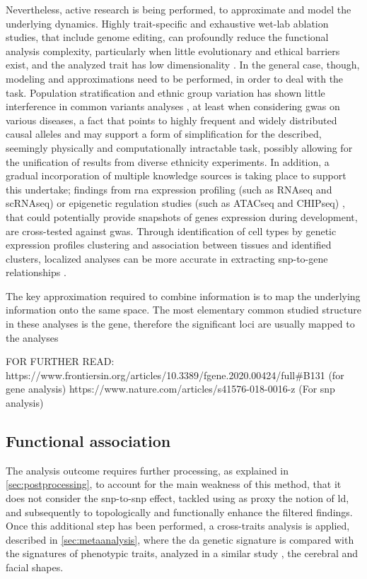 Nevertheless, active research is being performed, to approximate and model the underlying dynamics. Highly trait-specific and exhaustive wet-lab ablation studies, that include genome editing, can profoundly reduce the functional analysis complexity, particularly when little evolutionary and ethical barriers exist, and the analyzed trait has low dimensionality \cite{Rao2021}. In the general case, though, modeling and approximations need to be performed, in order to deal with the task. Population stratification and ethnic group variation has shown little interference in common variants analyses \cite{Visscher2012}, at least when considering \ac{gwas} on various diseases, a fact that points to highly frequent and widely distributed causal alleles and may support a form of simplification for the described, seemingly physically and computationally intractable task, possibly allowing for the unification of results from diverse ethnicity experiments. In addition, a gradual incorporation of multiple knowledge sources is taking place to support this undertake; findings from \ac{rna} expression profiling (such as RNAseq and scRNAseq) \cite{Yan2020,Zhou2022} or epigenetic regulation studies (such as ATACseq and CHIPseq) \cite{Corces2020,Huo2019}, that could potentially provide snapshots of genes expression during development, are cross-tested against \ac{gwas}. Through identification of cell types by genetic expression profiles clustering and association between tissues and identified clusters, localized analyses can be more accurate in extracting \ac{snp}-to-gene relationships \cite{Cano-Gamez2020}.


The key approximation required to combine information is to map the underlying information onto the same space. The most elementary common studied structure in these analyses is the gene, therefore the significant loci are usually mapped to the analyses

FOR FURTHER READ:
https://www.frontiersin.org/articles/10.3389/fgene.2020.00424/full#B131 (for gene analysis)
https://www.nature.com/articles/s41576-018-0016-z (For snp analysis)





\subsection{Functional association}



The analysis outcome requires further processing, as explained in \autoref{sec:postprocessing}, to account for the main weakness of this method, that it does not consider the \ac{snp}-to-\ac{snp} effect, tackled using as proxy the notion of \ac{ld}, and subsequently to topologically and functionally enhance the filtered findings. Once this additional step has been performed, a cross-traits analysis is applied, described in \autoref{sec:metaanalysis}, where the \ac{da} genetic signature is compared with the signatures of phenotypic traits, analyzed in a similar study \cite{Naqvi2021}, the cerebral and facial shapes.



